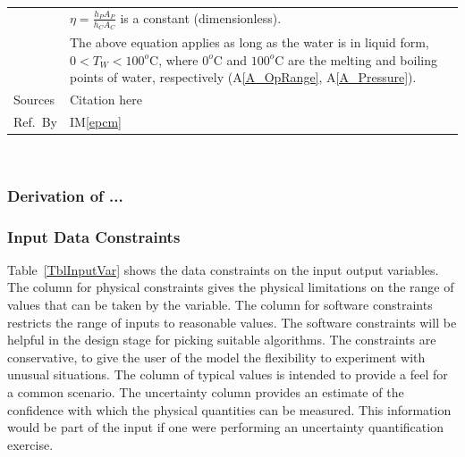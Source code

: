 \documentclass[12pt]{article}
\newcommand{\colAwidth}{0.13\textwidth}
\newcommand{\colBwidth}{0.82\textwidth}
\newcommand{\aref}[1]{A\ref{#1}}
\newcommand{\iref}[1]{IM\ref{#1}}
\begin{document}
\begin{minipage}{\textwidth}
\begin{tabular}{| p{\colAwidth} | p{\colBwidth}|}
                & $\eta = \frac{h_P A_P}{h_C A_C}$ is a constant (dimensionless).                     \\
                & The above equation applies as long as the water is in liquid form,
    $0<T_W<100^o\text{C}$, where $0^o\text{C}$ and $100^o\text{C}$ are the melting
    and boiling points of water, respectively (\aref{A_OpRange}, \aref{A_Pressure}).
    \\
    \hline
    Sources     & Citation here                                                                       \\
    \hline
    Ref.\ By    & \iref{epcm}                                                                         \\
    \hline
  \end{tabular}
\end{minipage}\\


\subsubsection*{Derivation of ...}


\subsubsection{Input Data Constraints} \label{sec_DataConstraints}

Table~\ref{TblInputVar} shows the data constraints on the input output
variables. The column for physical constraints gives the physical limitations
on the range of values that can be taken by the variable. The column for
software constraints restricts the range of inputs to reasonable values. The
software constraints will be helpful in the design stage for picking suitable
algorithms. The constraints are conservative, to give the user of the model the
flexibility to experiment with unusual situations. The column of typical values
is intended to provide a feel for a common scenario. The uncertainty column
provides an estimate of the confidence with which the physical quantities can
be measured. This information would be part of the input if one were performing
an uncertainty quantification exercise.
\end{document}
